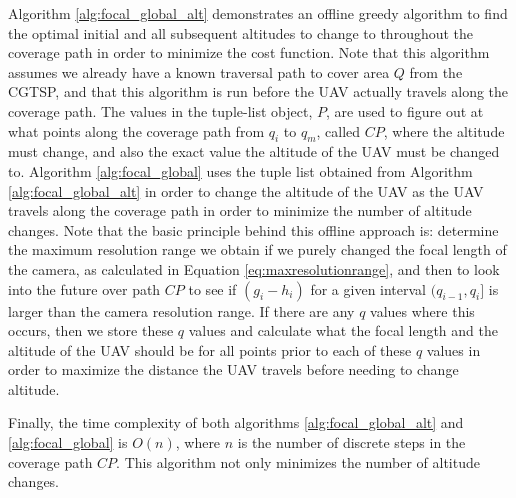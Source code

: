 \documentclass[conference]{IEEEtran}
\theoremstyle{plain}%
\begin{document}
Algorithm \ref{alg:focal_global_alt} demonstrates an offline greedy algorithm to find the optimal initial and all subsequent altitudes to change to throughout the coverage path in order to minimize the cost function. Note that this algorithm assumes we already have a known traversal path to cover area $Q$ from the CGTSP, and that this algorithm is run before the UAV actually travels along the coverage path. The values in the tuple-list object, $P$, are used to figure out at what points along the coverage path from $q_i$ to $q_m$, called $CP$, where the altitude must change, and also the exact value the altitude of the UAV must be changed to. Algorithm \ref{alg:focal_global} uses the tuple list obtained from Algorithm \ref{alg:focal_global_alt} in order to change the altitude of the UAV as the UAV travels along the coverage path in order to minimize the number of altitude changes. Note that the basic principle behind this offline approach is: determine the maximum resolution range we obtain if we purely changed the focal length of the camera, as calculated in Equation \ref{eq:maxresolutionrange}, and then to look into the future over path $CP$ to see if $(g_i - h_i)$ for a given interval $(q_{i-1}, q_i]$ is larger than the camera resolution range. If there are any $q$ values where this occurs, then we store these $q$ values and calculate what the focal length and the altitude of the UAV should be for all points prior to each of these $q$ values in order to maximize the distance the UAV travels before needing to change altitude.

Finally, the time complexity of both algorithms \ref{alg:focal_global_alt} and \ref{alg:focal_global} is $O(n)$, where $n$ is the number of discrete steps in the coverage path $CP$. This algorithm not only minimizes the number of altitude changes.
\end{document}

